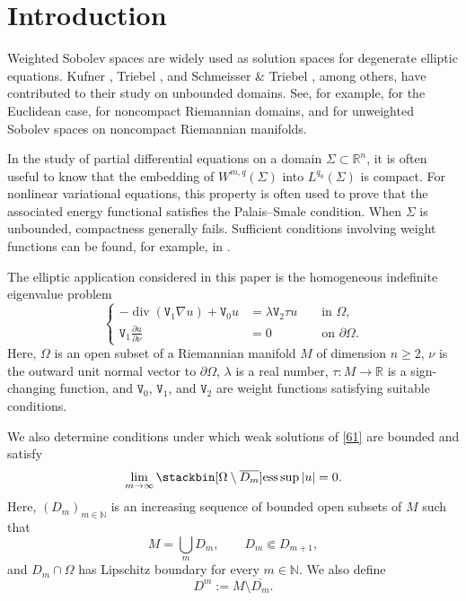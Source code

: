 \documentclass[reqno, 11pt, a4paper]{amsart}
\numberwithin{equation}{section}
\newcommand{\iwe}{ \tau}
\newcommand{\wghtv}{\mathtt{V}}
\newcommand{\qxp}{q}
\begin{document}
\tableofcontents
\section{Introduction}



Weighted Sobolev spaces are widely used as solution spaces for degenerate elliptic equations. Kufner \cite{kugner1985weightedsobo}, Triebel \cite{triebel1995interpolati}, and Schmeisser \& Triebel \cite{schmeisser1987topics}, among others, have contributed to their study on unbounded domains. See, for example, \cite{choquet2008einsteinequations, chua1992extensiontheorems, gruka1991weighteiii} for the Euclidean case, \cite{hamann2013singularmanifolds, pacini2013conicalsing} for noncompact Riemannian domains, and \cite{zbMATH06237307, post2023heatkernel} for unweighted Sobolev spaces on noncompact Riemannian manifolds.

In the study of partial differential equations on a domain \(\Sigma\subset\mathbb R^n\), it is often useful to know that the embedding of \(W^{m,\qxp}(\Sigma)\) into \(L^{\qxp_0}(\Sigma)\) is compact. For nonlinear variational equations, this property is often used to prove that the associated energy functional satisfies the Palais--Smale condition. When \(\Sigma\) is unbounded, compactness generally fails. Sufficient conditions involving weight functions can be found, for example, in \cite{adams1971compactembedding, gruka1991weighteiii, kufner1990hardytype}.

{ 
The elliptic application considered in this paper is the homogeneous indefinite eigenvalue problem
}
\begin{equation}
\left\{
\begin{aligned}
-\operatorname{div} ( \wghtv _1 \nabla u )+ \wghtv _0 u   & = \lambda \wghtv _2 \iwe u & & \text { in } \Omega,\\
\wghtv _1 \frac{\partial u}{\partial \nu} &= 0 & & \text { on } \partial \Omega .
\end{aligned}
\right. \label{61}
\end{equation}
Here, $\Omega$ is an open subset of a Riemannian manifold $M$ of dimension $n\geq2$, $\nu$ is the outward unit normal vector to $\partial\Omega$, $\lambda$ is a real number, $\iwe:M\rightarrow\mathbb R$ is a sign-changing function, and $\wghtv_0$, $\wghtv_1$, and $\wghtv_2$ are weight functions satisfying suitable conditions.

{ 
We also determine conditions under which weak solutions of \eqref{61} are bounded and satisfy
\begin{equation} \label{87}
\lim_{m\rightarrow\infty}\stackbin[\Omega\setminus\overline{D_m}]{}{\operatorname{ess}\sup}\,|u|=0.
\end{equation}
}
Here, $(D_m)_{m\in\mathbb N}$ is an increasing sequence of bounded open subsets of $M$ such that
$$
M=\bigcup_m D_m, \qquad D_m\Subset D_{m+1},
$$
and $D_m\cap\Omega$ has Lipschitz boundary for every $m\in\mathbb N$. We also define
$$
D^m:=M\setminus\overline{D_m}.
$$
\end{document}
